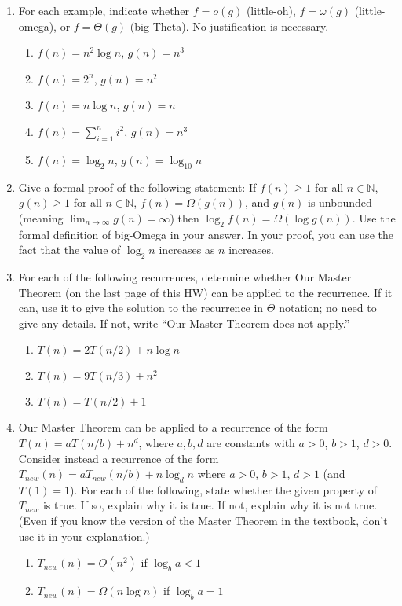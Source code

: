 \documentclass{article}
\begin{document}
\begin{enumerate}
    \item For each example, indicate whether $f = o(g)$ (little-oh), $f = \omega(g)$ (little-omega), or $f = \Theta(g)$ (big-Theta). No justification is necessary.
    \begin{enumerate}
        \item $f(n) = n^2 \log n$, $g(n) = n^3$
        \item $f(n) = 2^n$, $g(n) = n^2$
        \item $f(n) = n \log n$, $g(n) = n$
        \item $f(n) = \sum_{i=1}^n i^2$, $g(n) = n^3$
        \item $f(n) = \log_2 n$, $g(n) = \log_{10} n$
    \end{enumerate}

    \item Give a formal proof of the following statement: If $f(n) \ge 1$ for all $n \in \mathbb{N}$, $g(n) \ge 1$ for all $n \in \mathbb{N}$, $f(n) = \Omega(g(n))$, and $g(n)$ is unbounded (meaning $\lim_{n \to \infty} g(n) = \infty$) then $\log_2 f(n) = \Omega(\log g(n))$.
    Use the formal definition of big-Omega in your answer. In your proof, you can use the fact that the value of $\log_2 n$ increases as $n$ increases.

    \item For each of the following recurrences, determine whether Our Master Theorem (on the last page of this HW) can be applied to the recurrence. If it can, use it to give the solution to the recurrence in $\Theta$ notation; no need to give any details. If not, write “Our Master Theorem does not apply.”
    \begin{enumerate}
        \item $T(n) = 2T(n/2) + n \log n$
        \item $T(n) = 9T(n/3) + n^2$
        \item $T(n) = T(n/2) + 1$
    \end{enumerate}

    \item Our Master Theorem can be applied to a recurrence of the form $T(n) = aT(n/b) + n^d$, where $a, b, d$ are constants with $a > 0$, $b > 1$, $d > 0$. Consider instead a recurrence of the form $T_{new}(n) = aT_{new}(n/b) + n \log_d n$ where $a > 0$, $b > 1$, $d > 1$ (and $T(1) = 1$).
    For each of the following, state whether the given property of $T_{new}$ is true. If so, explain why it is true. If not, explain why it is not true. (Even if you know the version of the Master Theorem in the textbook, don’t use it in your explanation.)
    \begin{enumerate}
        \item $T_{new}(n) = O(n^2)$ if $\log_b a < 1$
        \item $T_{new}(n) = \Omega(n \log n)$ if $\log_b a = 1$
    \end{enumerate}


\end{enumerate}
\end{document}
